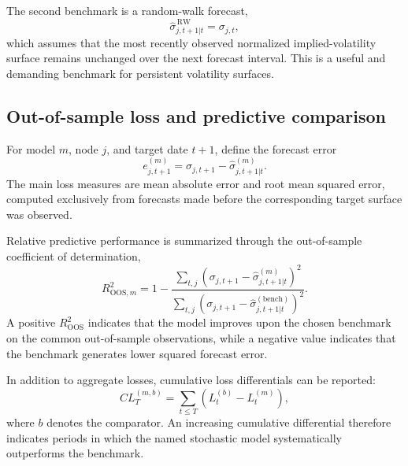 The second benchmark is a random-walk forecast,
\begin{equation}
    \widehat{\sigma}^{\,\mathrm{RW}}_{j,t+1|t}
    =
    \sigma_{j,t},
\end{equation}
which assumes that the most recently observed normalized implied-volatility
surface remains unchanged over the next forecast interval.  This is a useful
and demanding benchmark for persistent volatility surfaces.

\subsection{Out-of-sample loss and predictive comparison}
\label{subsec:oos_metrics}

For model $m$, node $j$, and target date $t+1$, define the forecast error
\begin{equation}
    e^{(m)}_{j,t+1}
    =
    \sigma_{j,t+1}
    -
    \widehat{\sigma}^{(m)}_{j,t+1|t}.
\end{equation}
The main loss measures are mean absolute error and root mean squared error,
computed exclusively from forecasts made before the corresponding target
surface was observed.

Relative predictive performance is summarized through the out-of-sample
coefficient of determination,
\begin{equation}
    R^2_{\mathrm{OOS},m}
    =
    1 -
    \frac{
        \sum_{t,j}
        \left(
            \sigma_{j,t+1}
            -
            \widehat{\sigma}^{(m)}_{j,t+1|t}
        \right)^2
    }{
        \sum_{t,j}
        \left(
            \sigma_{j,t+1}
            -
            \widehat{\sigma}^{(\mathrm{bench})}_{j,t+1|t}
        \right)^2
    }.
\end{equation}
A positive $R^2_{\mathrm{OOS}}$ indicates that the model improves upon the
chosen benchmark on the common out-of-sample observations, while a negative
value indicates that the benchmark generates lower squared forecast error.

In addition to aggregate losses, cumulative loss differentials can be reported:
\begin{equation}
    CL^{(m,b)}_T
    =
    \sum_{t \leq T}
    \left(
        L^{(b)}_t
        -
        L^{(m)}_t
    \right),
\end{equation}
where $b$ denotes the comparator.  An increasing cumulative differential
therefore indicates periods in which the named stochastic model systematically
outperforms the benchmark.

